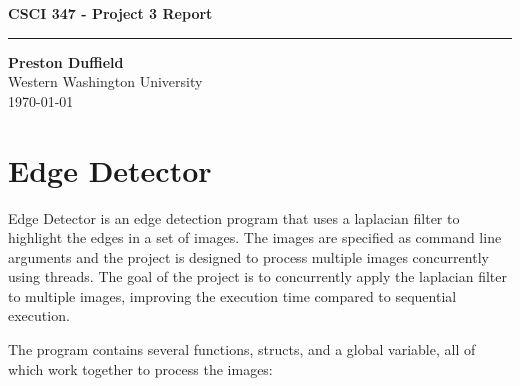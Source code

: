 \documentclass{article}
\begin{document}
\noindent
\begin{minipage}[t]{0.6\textwidth}
    \begin{flushleft}
        \LARGE\textbf{CSCI 347 - Project 3 Report} \\
        \vspace{6pt} %
        \hrule width 10cm
        \vspace{12pt}
        \large\textbf{Preston Duffield} \\
        \large Western Washington University \\
        \today
        \vspace{24pt}
    \end{flushleft}
\end{minipage}

\section*{Edge Detector}
Edge Detector is an edge detection program that uses a
laplacian filter to highlight the edges in a set of images.
The images are specified as command line arguments and the project
is designed to process multiple images concurrently using threads.
The goal of the project is to concurrently apply the laplacian
filter to multiple images, improving the execution time
compared to sequential execution. \\
\begin{flushleft}
  The program contains several functions, structs,
  and a global variable, all of which work together to process the images:
\end{flushleft}
\end{document}
